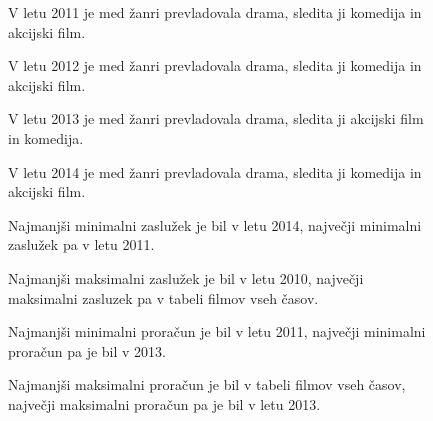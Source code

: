 \documentclass[11pt,a4paper]{article}
\begin{document}
\pagebreak
\begin{figure}[H]

\caption{V letu 2011 je med žanri prevladovala drama, sledita ji komedija in akcijski film.}
\end{figure}

\pagebreak
\begin{figure}[H]

\caption{V letu 2012 je med žanri prevladovala drama, sledita ji komedija in akcijski film.}
\end{figure}

\pagebreak
\begin{figure}[H]

\caption{V letu 2013 je med žanri prevladovala drama, sledita ji akcijski film in komedija.}
\end{figure}

\pagebreak
\begin{figure}[H]

\caption{V letu 2014 je med žanri prevladovala drama, sledita ji komedija in akcijski film.}
\end{figure}



\pagebreak
\begin{figure}[H]

\caption{Najmanjši minimalni zaslužek je bil v letu 2014, največji minimalni zaslužek pa v letu 2011.}
\end{figure}

\pagebreak
\begin{figure}[H]

\caption{Najmanjši maksimalni zaslužek je bil v letu 2010, največji maksimalni zasluzek pa v tabeli filmov vseh časov.}
\end{figure}

\pagebreak
\begin{figure}[H]

\caption{Najmanjši minimalni proračun je bil v letu 2011, največji minimalni proračun pa je bil v 2013.}
\end{figure}

\pagebreak
\begin{figure}[H]

\caption{Najmanjši maksimalni proračun je bil v tabeli filmov vseh časov, največji maksimalni proračun pa je bil v letu 2013.}
\end{figure}
\end{document}
